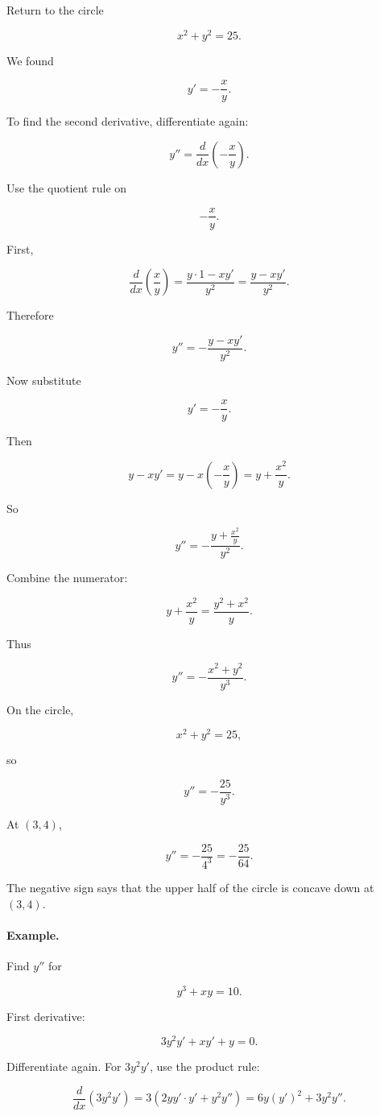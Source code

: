 Return to the circle

\[
x^2+y^2=25.
\]

We found

\[
y'=-\frac{x}{y}.
\]

To find the second derivative, differentiate again:

\[
y''=\frac{d}{dx}\left(-\frac{x}{y}\right).
\]

Use the quotient rule on

\[
-\frac{x}{y}.
\]

First,

\[
\frac{d}{dx}\left(\frac{x}{y}\right)
=
\frac{y\cdot 1-x y'}{y^2}
=
\frac{y-xy'}{y^2}.
\]

Therefore

\[
y''
=
-\frac{y-xy'}{y^2}.
\]

Now substitute

\[
y'=-\frac{x}{y}.
\]

Then

\[
y-xy'
=
y-x\left(-\frac{x}{y}\right)
=
y+\frac{x^2}{y}.
\]

So

\[
y''
=
-\frac{y+\frac{x^2}{y}}{y^2}.
\]

Combine the numerator:

\[
y+\frac{x^2}{y}
=
\frac{y^2+x^2}{y}.
\]

Thus

\[
y''
=
-\frac{x^2+y^2}{y^3}.
\]

On the circle,

\[
x^2+y^2=25,
\]

so

\[
\boxed{
y''=-\frac{25}{y^3}.
}
\]

At \((3,4)\),

\[
y''=-\frac{25}{4^3}=-\frac{25}{64}.
\]

The negative sign says that the upper half of the circle is concave down at \((3,4)\).

\paragraph{Example.}
Find \(y''\) for

\[
y^3+xy=10.
\]

First derivative:

\[
3y^2y'+xy'+y=0.
\]

Differentiate again.  For \(3y^2y'\), use the product rule:

\[
\frac{d}{dx}(3y^2y')
=
3\left(2yy'\cdot y' + y^2y''\right)
=
6y(y')^2+3y^2y''.
\]

